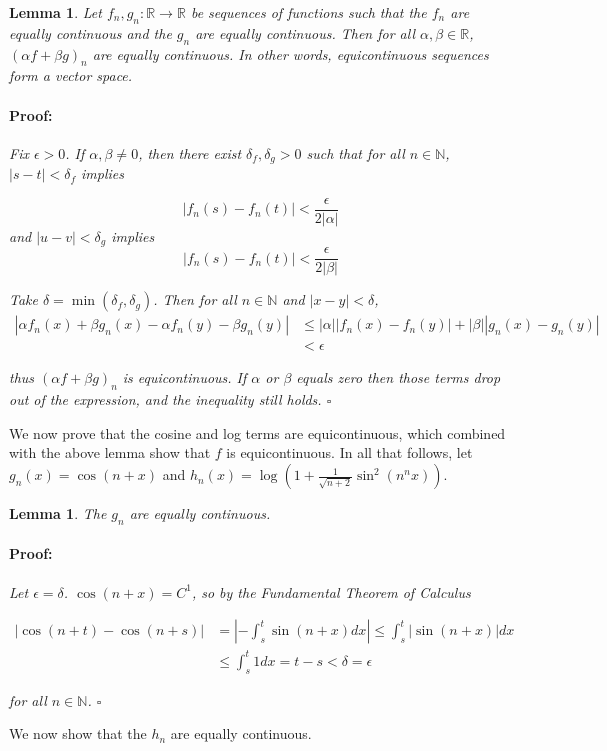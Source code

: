 \documentclass{article}
\newenvironment{proof}{\paragraph{Proof:}}{\hfill$\square$}
\newtheorem{lemma}[theorem]{Lemma}
\newcommand{\R}{\mathbb{R}}
\newcommand{\N}{\mathbb{N}}
\begin{document}
\begin{lemma}
Let $f_n, g_n: \R \rightarrow \R$ be sequences of functions such that the $f_n$ are equally continuous and the $g_n$ are equally continuous. Then for all $\alpha, \beta \in \R$, $(\alpha f + \beta g)_n$ are equally continuous. In other words, equicontinuous sequences form a vector space.

\begin{proof}
Fix $\epsilon > 0$. If $\alpha, \beta \neq 0$, then there exist $\delta_f, \delta_g > 0$ such that for all $n \in \N$, $|s-t| < \delta_f$ implies

\[
|f_n(s) - f_n(t)| < \frac{\epsilon}{2 |\alpha|}
\]
and $|u -v| < \delta_g$ implies
\[
|f_n(s) - f_n(t)| < \frac{\epsilon}{2 |\beta|}
\]

Take $\delta = \min(\delta_f, \delta_g)$. Then for all $n \in \N$ and $|x-y| < \delta$,
\begin{align*}
|\alpha f_n(x) + \beta g_n(x) - \alpha f_n(y) - \beta g_n(y)| &\leq |\alpha||f_n(x) - f_n(y)| + |\beta||g_n(x) - g_n(y)| \\
&< \epsilon
\end{align*}

thus $(\alpha f + \beta g)_n$ is equicontinuous. If $\alpha$ or $\beta$ equals zero then those terms drop out of the expression, and the inequality still holds.
\end{proof}
\end{lemma}

We now prove that the cosine and log terms are equicontinuous, which combined with the above lemma show that $f$ is equicontinuous. In all that follows, let $g_n(x) = \cos(n+x)$ and $h_n(x) = \log(1 + \frac{1}{\sqrt{n+2}} \sin^2(n^n x))$.

\begin{lemma}
The $g_n$ are equally continuous.
\begin{proof}
Let $\epsilon = \delta$. $\cos(n+x) = C^1$, so by the Fundamental Theorem of Calculus

\begin{align*}
|\cos(n+t) - \cos(n+s)| &= |- \int_s^t \sin(n+x)dx| \leq \int_s^t |\sin(n+x)|dx \\
&\leq \int_s^t 1 dx = t-s < \delta = \epsilon
\end{align*}

for all $n \in \N$.
\end{proof}
\end{lemma}

We now show that the $h_n$ are equally continuous.
\end{document}
